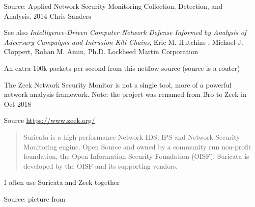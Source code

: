\documentclass[Screen16to9,17pt]{foils}
\begin{document}
Source: Applied Network Security Monitoring Collection, Detection, and Analysis, 2014 Chris Sanders



\begin{list2}
\item See also \emph{Intelligence-Driven Computer Network Defense Informed by Analysis of Adversary Campaigns and Intrusion Kill Chains}, Eric M. Hutchins , Michael J. Cloppert, Rohan M. Amin, Ph.D. Lockheed Martin Corporation\\{\footnotesize
 }
\end{list2}




\centerline{An extra 100k packets per second from this netflow source (source is a router)}





The Zeek Network Security Monitor is not a single tool, more of a
powerful network analysis framework. Note: the project was renamed from Bro to Zeek in Oct 2018

{\small Source \url{https://www.zeek.org/}}



\begin{quote}
Suricata is a high performance Network IDS, IPS and Network Security Monitoring engine. Open Source and owned by a community run non-profit foundation, the Open Information Security Foundation (OISF). Suricata is developed by the OISF and its supporting vendors.
\end{quote}


\centerline{I often use Suricata and Zeek together}




Source: picture from 
\end{document}
